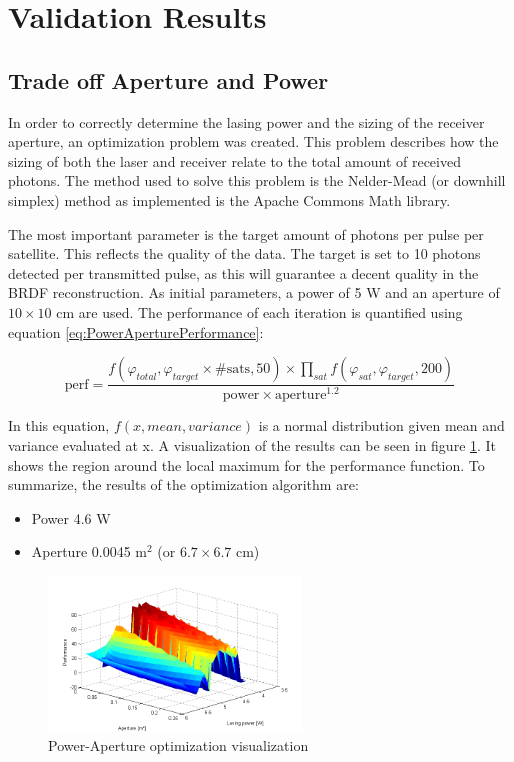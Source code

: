 \section{Validation Results}
\label{sec:ValidationResults}

\subsection{Trade off Aperture and Power}
\label{sec:PowerApertureTradeoff}

In order to correctly determine the lasing power and the sizing of the receiver aperture, an optimization problem was created. This problem describes how the sizing of both the laser and receiver relate to the total amount of received photons. The method used to solve this problem is the Nelder-Mead (or downhill simplex) method as implemented is the Apache Commons Math library.

The most important parameter is the target amount of photons per pulse per satellite. This reflects the quality of the data. The target is set to 10 photons detected per transmitted pulse, as this will guarantee a decent quality in the \ac{BRDF} reconstruction. As initial parameters, a power of 5 W and an aperture of $10\times10$ cm are used. The performance of each iteration is quantified using equation \ref{eq:PowerAperturePerformance}:

\begin{equation}
	\text{perf} = \frac {f(\varphi_{total}, \varphi_{target} \times \text{\# sats}, 50) \times 
												\displaystyle\prod_{sat} f(\varphi_{sat}, \varphi_{target}, 200) }
											{ \text{power} \times \text{aperture}^{1.2}}
	\label{eq:PowerAperturePerformance}
\end{equation}

In this equation, $f(x, mean, variance)$ is a normal distribution given mean and variance evaluated at x. A visualization of the results can be seen in figure \ref{fig:PowerAperturePerformance}. It shows the region around the local maximum for the performance function. To summarize, the results of the optimization algorithm are:

\begin{itemize}
	\item Power 4.6 W
	\item Aperture 0.0045 m$^2$ (or $6.7\times6.7$ cm)
\end{itemize}

\begin{figure}[ht]
	\centering
	\includegraphics[width=0.6\textwidth]{chapters/img/optimize-PowerAperture.png}%
		\caption{Power-Aperture optimization visualization}%
		\label{fig:PowerAperturePerformance}%
\end{figure}

